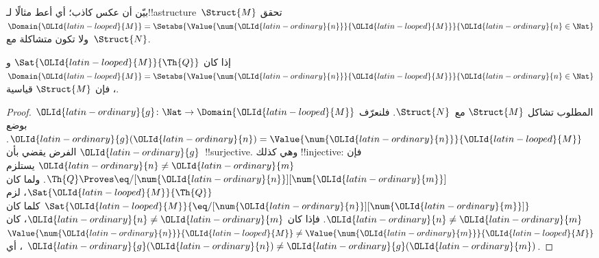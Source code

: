 \documentclass[../../../include/open-logic-section]{subfiles}
\begin{document}
\begin{prob}
بيّن أن عكس  كاذب؛ أي أعط
مثالًا لـ!!a{structure}~$\Struct{M}$ تحقق
$\Domain{{\OLId{latin-looped}{M}}} = \Setabs{\Value{\num{{\OLId{latin-ordinary}{n}}}}{{\OLId{latin-looped}{M}}}}{{\OLId{latin-ordinary}{n}} \in \Nat}$ ولا تكون
متشاكلة مع~$\Struct{N}$.
\end{prob}

\begin{prop}
إذا كان $\Sat{{\OLId{latin-looped}{M}}}{\Th{Q}}$ و
$\Domain{{\OLId{latin-looped}{M}}} = \Setabs{\Value{\num{{\OLId{latin-ordinary}{n}}}}{{\OLId{latin-looped}{M}}}}{{\OLId{latin-ordinary}{n}} \in \Nat}$، فإن
$\Struct{M}$ قياسية.
\end{prop}

\begin{proof}
المطلوب تشاكل $\Struct{M}$ مع~$\Struct{N}$. فلنعرّف
${\OLId{latin-ordinary}{g}}\colon \Nat \to \Domain{{\OLId{latin-looped}{M}}}$ بوضع
${\OLId{latin-ordinary}{g}}({\OLId{latin-ordinary}{n}})=\Value{\num{{\OLId{latin-ordinary}{n}}}}{{\OLId{latin-looped}{M}}}$. الفرض يقضي بأن ${\OLId{latin-ordinary}{g}}$~!!{surjective}.
وهي كذلك !!{injective}: فإن ${\OLId{latin-ordinary}{n}} \neq {\OLId{latin-ordinary}{m}}$ يستلزم
$\Th{Q} \Proves \eq/[\num{{\OLId{latin-ordinary}{n}}}][\num{{\OLId{latin-ordinary}{m}}}]$. ولما كان
$\Sat{{\OLId{latin-looped}{M}}}{\Th{Q}}$، لزم $\Sat{{\OLId{latin-looped}{M}}}{\eq/[\num{{\OLId{latin-ordinary}{n}}}][\num{{\OLId{latin-ordinary}{m}}}]}$
كلما كان ${\OLId{latin-ordinary}{n}} \neq {\OLId{latin-ordinary}{m}}$. فإذا كان ${\OLId{latin-ordinary}{n}} \neq {\OLId{latin-ordinary}{m}}$، كان
$\Value{\num{{\OLId{latin-ordinary}{n}}}}{{\OLId{latin-looped}{M}}} \neq \Value{\num{{\OLId{latin-ordinary}{m}}}}{{\OLId{latin-looped}{M}}}$، أي ${\OLId{latin-ordinary}{g}}({\OLId{latin-ordinary}{n}}) \neq {\OLId{latin-ordinary}{g}}({\OLId{latin-ordinary}{m}})$.


\end{proof}
\end{document}

